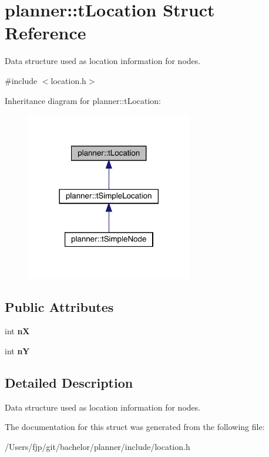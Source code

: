 \hypertarget{structplanner_1_1t_location}{}\section{planner\+:\+:t\+Location Struct Reference}
\label{structplanner_1_1t_location}


Data structure used as location information for nodes.  




{\ttfamily \#include $<$location.\+h$>$}



Inheritance diagram for planner\+:\+:t\+Location\+:\nopagebreak
\begin{figure}[H]
\begin{center}
\leavevmode
\includegraphics[width=206pt]{structplanner_1_1t_location__inherit__graph}
\end{center}
\end{figure}
\subsection*{Public Attributes}
\begin{DoxyCompactItemize}
\item 
\mbox{\label{structplanner_1_1t_location_aca6603f36eb5d71b738ec085080d4f76}} 
int {\bfseries nX}
\item 
\mbox{\label{structplanner_1_1t_location_a83bc1d843b7603e1fc9913001b41421a}} 
int {\bfseries nY}
\end{DoxyCompactItemize}


\subsection{Detailed Description}
Data structure used as location information for nodes. 

The documentation for this struct was generated from the following file\+:\begin{DoxyCompactItemize}
\item 
/\+Users/fjp/git/bachelor/planner/include/location.\+h\end{DoxyCompactItemize}
